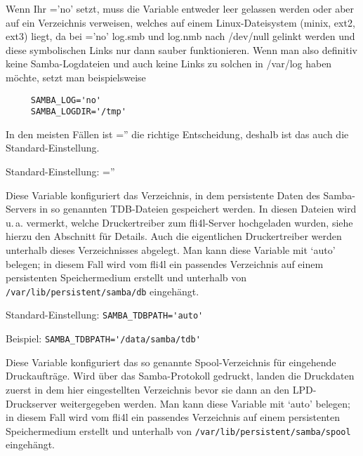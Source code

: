 \begin{description}
    Wenn Ihr ='no' setzt, muss die Variable
     entweder leer gelassen werden oder aber auf ein
    Verzeichnis verweisen, welches auf einem Linux-Dateisystem
    (minix, ext2, ext3) liegt, da bei ='no' log.smb
    und log.nmb nach /dev/null gelinkt werden und diese symbolischen Links nur
    dann sauber funktionieren.
    Wenn man also definitiv keine Samba-Logdateien und auch keine Links zu
    solchen in /var/log haben möchte, setzt man beispielsweise

\begin{example}
\begin{verbatim}
     SAMBA_LOG='no'
     SAMBA_LOGDIR='/tmp'
\end{verbatim}
\end{example}

    In den meisten Fällen ist ='' die richtige Entscheidung,
    deshalb ist das auch die Standard-Einstellung.

    Standard-Einstellung: =''


    Diese Variable konfiguriert das Verzeichnis, in dem persistente Daten des
    Samba-Servers in so genannten TDB-Dateien gespeichert werden. In diesen
    Dateien wird u.\,a. vermerkt, welche Druckertreiber zum fli4l-Server
    hochgeladen wurden, siehe hierzu den Abschnitt
     für Details. Auch die
    eigentlichen Druckertreiber werden unterhalb dieses Verzeichnisses
    abgelegt. Man kann diese Variable mit `auto' belegen; in diesem Fall wird
    vom fli4l ein passendes Verzeichnis auf einem persistenten Speichermedium
    erstellt und unterhalb von \texttt{/var/lib/persistent/samba/db}
    eingehängt.

    Standard-Einstellung: \verb+SAMBA_TDBPATH='auto'+

    Beispiel: \verb+SAMBA_TDBPATH='/data/samba/tdb'+


    Diese Variable konfiguriert das so genannte Spool-Verzeichnis für
    eingehende Druckaufträge. Wird über das Samba-Protokoll gedruckt, landen
    die Druckdaten zuerst in dem hier eingestellten Verzeichnis bevor sie dann
    an den LPD-Druckserver weitergegeben werden. Man kann diese Variable mit
    `auto' belegen; in diesem Fall wird vom fli4l ein passendes Verzeichnis auf
    einem persistenten Speichermedium erstellt und unterhalb von
    \texttt{/var/lib/persistent/samba/spool} eingehängt.


\end{description}
